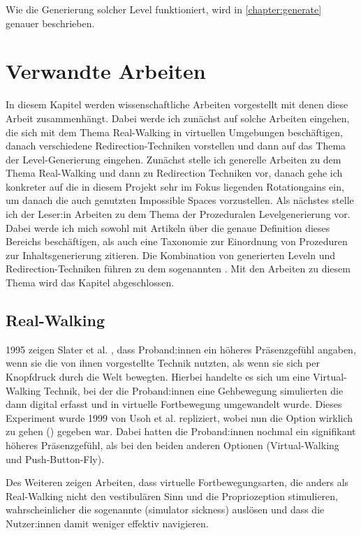 Wie die Generierung solcher Level funktioniert, wird in \autoref{chapter:generate} genauer beschrieben.

\chapter{Verwandte Arbeiten}\label{chapter:relatedwork}

In diesem Kapitel werden wissenschaftliche Arbeiten vorgestellt mit denen diese Arbeit zusammenhängt. Dabei werde ich zunächst auf solche Arbeiten eingehen, die sich mit dem Thema Real-Walking in virtuellen Umgebungen beschäftigen, danach verschiedene Redirection-Techniken vorstellen und dann auf das Thema der Level-Generierung eingehen. Zunächst stelle ich generelle Arbeiten zu dem Thema Real-Walking und dann zu Redirection Techniken vor, danach gehe ich konkreter auf die in diesem Projekt sehr im Fokus liegenden Rotationgains ein, um danach die auch genutzten Impossible Spaces vorzustellen. Als nächstes stelle ich der Leser:in Arbeiten zu dem Thema der Prozeduralen Levelgenerierung vor. Dabei werde ich mich sowohl mit Artikeln über die genaue Definition dieses Bereichs beschäftigen, als auch eine Taxonomie zur Einordnung von Prozeduren zur Inhaltsgenerierung zitieren. Die Kombination von generierten Leveln und Redirection-Techniken führen zu dem sogenannten . Mit den Arbeiten zu diesem Thema wird das Kapitel abgeschlossen.

\section{Real-Walking}
1995 zeigen Slater et al. \cite{taking-steps}, dass Proband:innen ein höheres Präsenzgefühl angaben, wenn sie die von ihnen vorgestellte Technik  nutzten, als wenn sie sich per Knopfdruck durch die Welt bewegten. Hierbei handelte es sich um eine Virtual-Walking Technik, bei der die Proband:innen eine Gehbewegung simulierten die dann digital erfasst und in virtuelle Fortbewegung umgewandelt wurde. Dieses Experiment wurde 1999 von Usoh et al. \cite{usoh-vergleich-1999} repliziert, wobei nun die Option wirklich zu gehen () gegeben war. Dabei hatten die Proband:innen nochmal ein signifikant höheres Präsenzgefühl, als bei den beiden anderen Optionen (Virtual-Walking und Push-Button-Fly).

Des Weiteren zeigen Arbeiten, dass virtuelle Fortbewegungsarten, die anders
als Real-Walking nicht den vestibulären Sinn und die Propriozeption stimulieren, wahrscheinlicher die sogenannte  (simulator sickness) auslösen \cite{locomotion-path-integration} und dass die Nutzer:innen damit weniger effektiv navigieren. \cite{benefits-real-walking}

